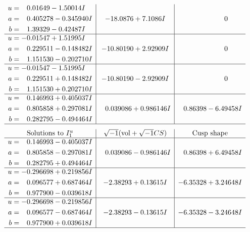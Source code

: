\documentclass[1p]{elsarticle_modified}
\theoremstyle{definition}
\newcommand{\I}{\sqrt{-1}}
\begin{document}
$$\begin{array}{c|c|c}
\begin{aligned}
u &= \phantom{-}0.01649 - 1.50014 I \\
a &= \phantom{-}0.405278 - 0.345940 I \\
b &= \phantom{-}1.39329 - 0.42487 I\end{aligned}
 & -18.0876 + 7.1086 I & \phantom{-0.000000 } 0 \\ \hline\begin{aligned}
u &= -0.01547 + 1.51995 I \\
a &= \phantom{-}0.229511 - 0.148482 I \\
b &= \phantom{-}1.151530 - 0.202710 I\end{aligned}
 & -10.80190 + 2.92909 I & \phantom{-0.000000 } 0 \\ \hline\begin{aligned}
u &= -0.01547 - 1.51995 I \\
a &= \phantom{-}0.229511 + 0.148482 I \\
b &= \phantom{-}1.151530 + 0.202710 I\end{aligned}
 & -10.80190 - 2.92909 I & \phantom{-0.000000 } 0 \\ \hline\begin{aligned}
u &= \phantom{-}0.146993 + 0.405037 I \\
a &= \phantom{-}0.805858 + 0.297081 I \\
b &= \phantom{-}0.282795 - 0.494464 I\end{aligned}
 & \phantom{-}0.039086 + 0.986146 I & \phantom{-}0.86398 - 6.49458 I\\
 \hline 
 \end{array}$$\newpage$$\begin{array}{c|c|c}  
\text{Solutions to }I^u_{1}& \I (\text{vol} + \sqrt{-1}CS) & \text{Cusp shape}\\
 \hline 
\begin{aligned}
u &= \phantom{-}0.146993 - 0.405037 I \\
a &= \phantom{-}0.805858 - 0.297081 I \\
b &= \phantom{-}0.282795 + 0.494464 I\end{aligned}
 & \phantom{-}0.039086 - 0.986146 I & \phantom{-}0.86398 + 6.49458 I \\ \hline\begin{aligned}
u &= -0.296698 + 0.219856 I \\
a &= \phantom{-}0.096577 + 0.687464 I \\
b &= \phantom{-}0.977900 - 0.039618 I\end{aligned}
 & -2.38293 + 0.13615 I & -6.35328 + 3.24648 I \\ \hline\begin{aligned}
u &= -0.296698 - 0.219856 I \\
a &= \phantom{-}0.096577 - 0.687464 I \\
b &= \phantom{-}0.977900 + 0.039618 I\end{aligned}
 & -2.38293 - 0.13615 I & -6.35328 - 3.24648 I\\
 \hline 
 \end{array}$$\newpage\newpage\renewcommand{\arraystretch}{1}
\end{document}
